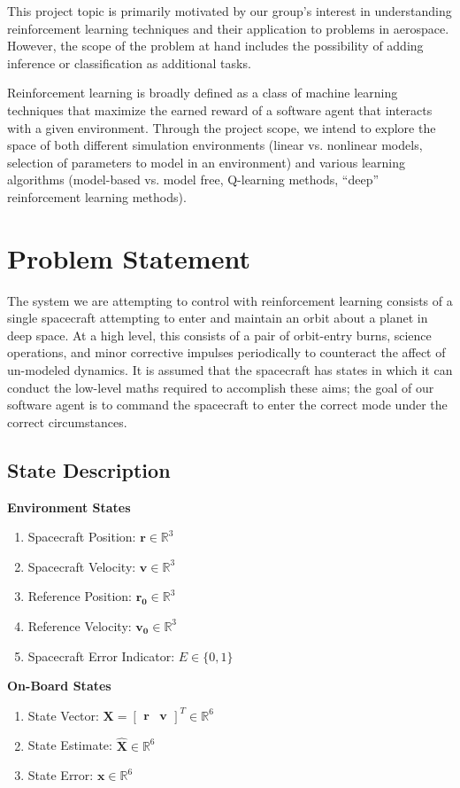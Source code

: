 \documentclass[]{article}
\begin{document}
This project topic is primarily motivated by our group's interest in understanding reinforcement learning techniques and their application to problems in aerospace. However, the scope of the problem at hand includes the possibility of adding inference or classification as additional tasks.

Reinforcement learning is broadly defined as a class of machine learning techniques that maximize the earned reward of a software agent that interacts with a given environment. Through the project scope, we intend to explore the space of both different simulation environments (linear vs. nonlinear models, selection of parameters to model in an environment) and various learning algorithms (model-based vs. model free, Q-learning methods, ``deep'' reinforcement learning methods). 

\section{Problem Statement}
The system we are attempting to control with reinforcement learning consists of a single spacecraft attempting to enter and maintain an orbit about a planet in deep space. At a high level, this consists of a pair of orbit-entry burns, science operations, and minor corrective impulses periodically to counteract the affect of un-modeled dynamics. It is assumed that the spacecraft has states in which it can conduct the low-level maths required to accomplish these aims; the goal of our software agent is to command the spacecraft to enter the correct mode under the correct circumstances. 

\begin{multicols}{2}
\subsection{State Description}
\textbf{Environment States}

\begin{enumerate}
	\item Spacecraft Position: $\mathbf{r} \in \mathbb{R}^3$
	\item Spacecraft Velocity: $\mathbf{v} \in \mathbb{R}^3$
	\item Reference Position: $\mathbf{r_0} \in \mathbb{R}^3$
	\item Reference Velocity: $\mathbf{v_0} \in \mathbb{R}^3$
	\item Spacecraft Error Indicator: $E \in \{0,1\}$
\end{enumerate}

\textbf{On-Board States}
\begin{enumerate}
	\item State Vector: $\mathbf{X}= \begin{bmatrix} \mathbf{r} &\mathbf{v}\end{bmatrix}^T \in \mathbb{R}^6$
	\item State Estimate: $\mathbf{\hat{X}} \in \mathbb{R}^6$
	\item State Error: $\mathbf{x} \in \mathbb{R}^6$
\end{enumerate}
\end{multicols}
\end{document}

